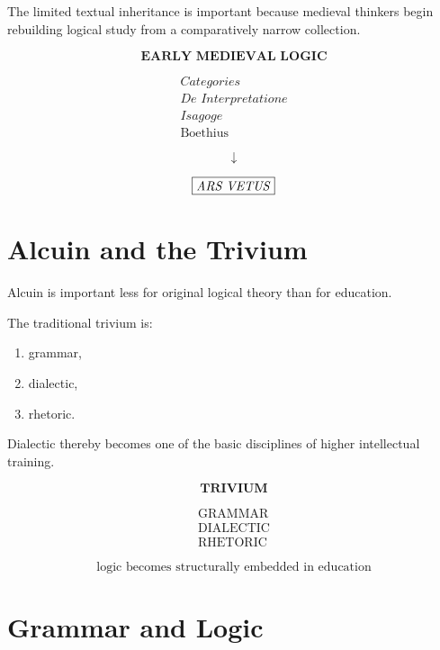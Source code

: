 \documentclass[11pt]{article}
\newcommand{\latin}[1]{\textit{#1}}
\begin{document}
The limited textual inheritance is important because medieval
thinkers begin rebuilding logical study from a comparatively
narrow collection.

\begin{whiteboard}
\[
\textbf{EARLY MEDIEVAL LOGIC}
\]

\[
\begin{array}{c}
\textit{Categories}\\
\textit{De Interpretatione}\\
\textit{Isagoge}\\
\text{Boethius}
\end{array}
\]

\[
\downarrow
\]

\[
\boxed{\text{\latin{ARS VETUS}}}
\]
\end{whiteboard}

\section{Alcuin and the Trivium}

Alcuin is important less for original logical theory than for
education.

The traditional trivium is:

\begin{enumerate}
    \item grammar,
    \item dialectic,
    \item rhetoric.
\end{enumerate}

Dialectic thereby becomes one of the basic disciplines of higher
intellectual training.

\begin{whiteboard}
\[
\textbf{TRIVIUM}
\]

\[
\begin{array}{c}
\text{GRAMMAR}\\
\text{DIALECTIC}\\
\text{RHETORIC}
\end{array}
\]

\[
\boxed{\text{logic becomes structurally embedded in education}}
\]
\end{whiteboard}

\section{Grammar and Logic}
\end{document}

